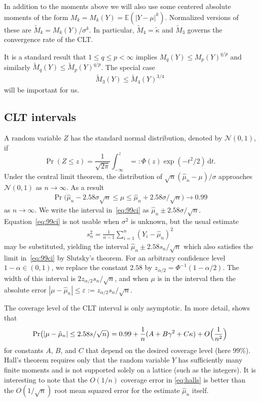\documentclass[graybox]{svmult}
\newcommand\e{\mathbb{E}}
\newcommand{\rd}{\,\mathrm{d}}
\newcommand{\dnorm}{\mathcal{N}}
\newcommand{\abs}[1]{\left|#1\right|}
\def\abs#1{\ensuremath{\left \lvert #1 \right \rvert}}
\begin{document}
In addition to the moments above we will also
use some centered absolute moments
of the form $M_k=M_k(Y) = \e( |Y-\mu|^k)$.
Normalized versions of these are
$\widetilde M_k=M_k(Y)/\sigma^k$.
In particular, $\widetilde M_4 = \tilde\kappa$
and $\widetilde M_3$ governs the convergence rate
of the CLT.

It is a standard result that $1\le q\le p<\infty$
implies $M_q(Y) \le M_p(Y)^{q/p}$
and similarly
 $\widetilde M_q(Y) \le \widetilde M_p(Y)^{q/p}$.
The special case 
\begin{align}\label{eq:boundm3}
\widetilde M_3(Y) \le \widetilde M_4(Y)^{3/4}
\end{align}
will be important for us.

\subsection{CLT intervals}

A random variable $Z$ has the standard normal distribution,
denoted by $\dnorm(0,1)$, if 
$$\Pr( Z\le z ) = \frac1{\sqrt{2\pi}}\int_{-\infty}^z =: \Phi(z)
\exp(-t^2/2)\rd t.$$
Under the central limit theorem,
the distribution of $\sqrt{n}(\hat\mu_n-\mu)/\sigma$
approaches $\dnorm(0,1)$ 
as $n\to\infty$.
As a result
\begin{align}\label{eq:99ci}
\Pr\bigl(
\hat\mu_n-2.58\sigma\sqrt{n}
\le \mu\le
\hat\mu_n+2.58\sigma/\sqrt{n}\bigr)
\to 0.99
\end{align}
as $n\to\infty$.
We write the interval in~\eqref{eq:99ci}
as $\hat\mu_n\pm 2.58\sigma/\sqrt{n}$.
Equation~\eqref{eq:99ci} is not usable when
$\sigma^2$ is unknown, but the usual estimate
\begin{align}\label{eq:samplevar}
s^2_n = \frac1{n-1}\sum_{i=1}^n(Y_i-\hat\mu_n)^2
\end{align}
may be substituted, yielding the interval
$\hat\mu_n\pm2.58s_n/\sqrt{n}$ which also
satisfies the limit in~\eqref{eq:99ci}
by Slutsky's theorem.  For an arbitrary
confidence level $1-\alpha\in(0,1)$, we replace
the constant $2.58$ by $z_{\alpha/2}=\Phi^{-1}(1-\alpha/2)$. 
The width of this interval is
$2z_{\alpha/2}s_n/\sqrt{n}$, and when $\mu$ is in
the interval then the absolute error
$|\mu-\hat\mu_n|\le 
\varepsilon := z_{\alpha/2}s_n/\sqrt{n}$.


The coverage level of the CLT interval is only asymptotic. In
more detail, \cite{Hal86} shows that
\begin{align}\label{eq:halls}
\Pr\bigl(
\abs{\mu - 
\hat\mu_n} \le 2.58 s/\sqrt{n}
\bigr)
= 0.99 + \frac1n(A + B\gamma^2+C\kappa) + O\Bigl(\frac1{n^2}\Bigr)
\end{align}
for constants $A$, $B$, and $C$ that depend
on the desired coverage level (here $99$\%).  Hall's theorem
requires only that the random variable $Y$ has sufficiently
many finite moments
and is not supported solely on a lattice (such as
the integers).
It is interesting to note that the $O(1/n)$ coverage error in
\eqref{eq:halls} is better than the $O(1/\sqrt{n})$
root mean squared error for the estimate $\hat\mu_n$ itself.
\end{document}

